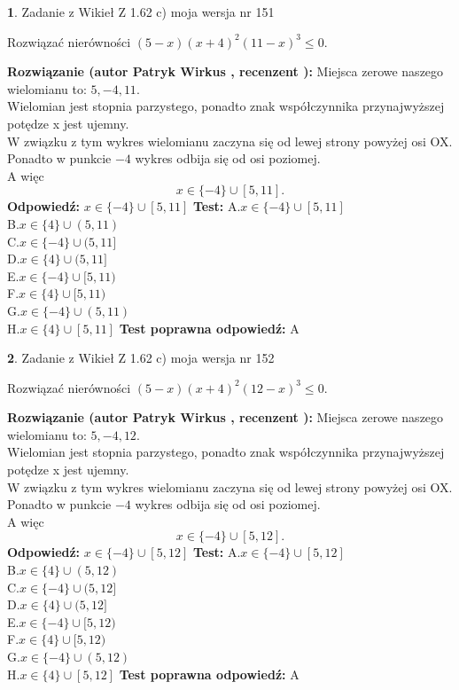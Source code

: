 \documentclass[12pt, a4paper]{article}
\theoremstyle{definition} %
\newtheorem{zad}{}
\newcommand{\zadStart}[1]{\begin{zad}#1\newline}
\newcommand{\zadStop}{\end{zad}}
\newcommand{\rozwStart}[2]{\noindent \textbf{Rozwiązanie (autor #1 , recenzent #2): }\newline}
\newcommand{\rozwStop}{\newline}
\newcommand{\odpStart}{\noindent \textbf{Odpowiedź:}\newline}
\newcommand{\odpStop}{\newline}
\newcommand{\testStart}{\noindent \textbf{Test:}\newline}
\newcommand{\testStop}{\newline}
\newcommand{\kluczStart}{\noindent \textbf{Test poprawna odpowiedź:}\newline}
\newcommand{\kluczStop}{\newline}
\begin{document}
\zadStart{Zadanie z Wikieł Z 1.62 c) moja wersja nr 151}

Rozwiązać nierówności $(5-x)(x+4)^{2}(11-x)^{3}\le0$.
\zadStop
\rozwStart{Patryk Wirkus}{}
Miejsca zerowe naszego wielomianu to: $5, -4, 11$.\\
Wielomian jest stopnia parzystego, ponadto znak współczynnika przy\linebreak najwyższej potędze x jest ujemny.\\ W związku z tym wykres wielomianu zaczyna się od lewej strony powyżej osi OX.\\
Ponadto w punkcie $-4$ wykres odbija się od osi poziomej.\\
A więc $$x \in \{-4\} \cup [5,11].$$
\rozwStop
\odpStart
$x \in \{-4\} \cup [5,11]$
\odpStop
\testStart
A.$x \in \{-4\} \cup [5,11]$\\
B.$x \in \{4\} \cup (5,11)$\\
C.$x \in \{-4\} \cup (5,11]$\\
D.$x \in \{4\} \cup (5,11]$\\
E.$x \in \{-4\} \cup [5,11)$\\
F.$x \in \{4\} \cup [5,11)$\\
G.$x \in \{-4\} \cup (5,11)$\\
H.$x \in \{4\} \cup [5,11]$
\testStop
\kluczStart
A
\kluczStop



\zadStart{Zadanie z Wikieł Z 1.62 c) moja wersja nr 152}

Rozwiązać nierówności $(5-x)(x+4)^{2}(12-x)^{3}\le0$.
\zadStop
\rozwStart{Patryk Wirkus}{}
Miejsca zerowe naszego wielomianu to: $5, -4, 12$.\\
Wielomian jest stopnia parzystego, ponadto znak współczynnika przy\linebreak najwyższej potędze x jest ujemny.\\ W związku z tym wykres wielomianu zaczyna się od lewej strony powyżej osi OX.\\
Ponadto w punkcie $-4$ wykres odbija się od osi poziomej.\\
A więc $$x \in \{-4\} \cup [5,12].$$
\rozwStop
\odpStart
$x \in \{-4\} \cup [5,12]$
\odpStop
\testStart
A.$x \in \{-4\} \cup [5,12]$\\
B.$x \in \{4\} \cup (5,12)$\\
C.$x \in \{-4\} \cup (5,12]$\\
D.$x \in \{4\} \cup (5,12]$\\
E.$x \in \{-4\} \cup [5,12)$\\
F.$x \in \{4\} \cup [5,12)$\\
G.$x \in \{-4\} \cup (5,12)$\\
H.$x \in \{4\} \cup [5,12]$
\testStop
\kluczStart
A
\kluczStop
\end{document}
